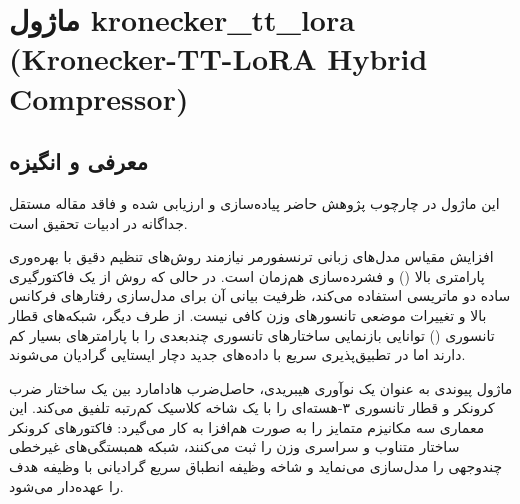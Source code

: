 \section{ماژول kronecker\_tt\_lora (Kronecker-TT-LoRA Hybrid Compressor)}
\label{sec:module_kronecker_tt_lora}

\subsection{معرفی و انگیزه}
این ماژول در چارچوب پژوهش حاضر پیاده‌سازی و ارزیابی شده و فاقد مقاله مستقل جداگانه در ادبیات تحقیق است.

افزایش مقیاس مدل‌های زبانی ترنسفورمر نیازمند روش‌های تنظیم دقیق با بهره‌وری پارامتری بالا () و فشرده‌سازی هم‌زمان است. در حالی که روش  از یک فاکتورگیری ساده دو ماتریسی استفاده می‌کند، ظرفیت بیانی آن برای مدل‌سازی رفتارهای فرکانس بالا و تغییرات موضعی تانسورهای وزن کافی نیست. از طرف دیگر، شبکه‌های قطار تانسوری () توانایی بازنمایی ساختارهای تانسوری چندبعدی را با پارامترهای بسیار کم دارند اما در تطبیق‌پذیری سریع با داده‌های جدید دچار ایستایی گرادیان می‌شوند.

ماژول پیوندی  به عنوان یک نوآوری هیبریدی، حاصل‌ضرب هادامارد بین یک ساختار ضرب کرونکر و قطار تانسوری ۳-هسته‌ای را با یک شاخه کلاسیک کم‌رتبه  تلفیق می‌کند. این معماری سه مکانیزم متمایز را به صورت هم‌افزا به کار می‌گیرد: فاکتورهای کرونکر ساختار متناوب و سراسری وزن را ثبت می‌کنند، شبکه  همبستگی‌های غیرخطی چندوجهی را مدل‌سازی می‌نماید و شاخه  وظیفه انطباق سریع گرادیانی با وظیفه هدف را عهده‌دار می‌شود.

